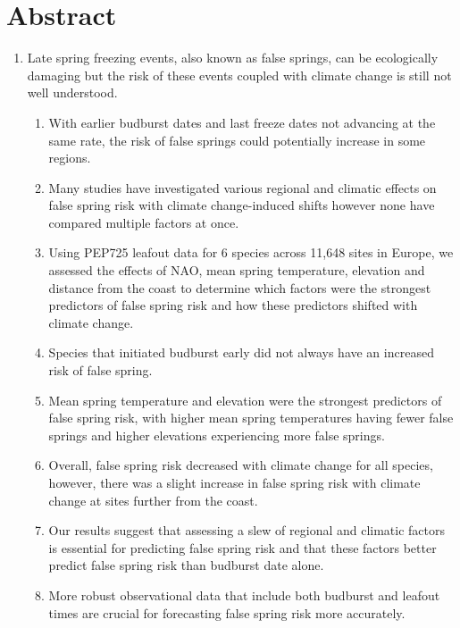 \documentclass{article}\usepackage[]{graphicx}\usepackage[]{color}
\begin{document}
\section*{Abstract}
\begin{enumerate}
\item Late spring freezing events, also known as false springs, can be ecologically damaging but the risk of these events coupled with climate change is still not well understood. 
  \begin{enumerate}
  \item With earlier budburst dates and last freeze dates not advancing at the same rate, the risk of false springs could potentially increase in some regions.
  \item Many studies have investigated various regional and climatic effects on false spring risk with climate change-induced shifts however none have compared multiple factors at once.
  \item Using PEP725 leafout data for 6 species across 11,648 sites in Europe, we assessed the effects of NAO, mean spring temperature, elevation and distance from the coast to determine which factors were the strongest predictors of false spring risk and how these predictors shifted with climate change. 
  \item Species that initiated budburst early did not always have an increased risk of false spring.
  \item Mean spring temperature and elevation were the strongest predictors of false spring risk, with higher mean spring temperatures having fewer false springs and higher elevations experiencing more false springs.
  \item Overall, false spring risk decreased with climate change for all species, however, there was a slight increase in false spring risk with climate change at sites further from the coast.
  \item Our results suggest that assessing a slew of regional and climatic factors is essential for predicting false spring risk and that these factors better predict false spring risk than budburst date alone. 
  \item More robust observational data that include both budburst and leafout times are crucial for forecasting false spring risk more accurately.
  \end{enumerate}
\end{enumerate}
\end{document}
